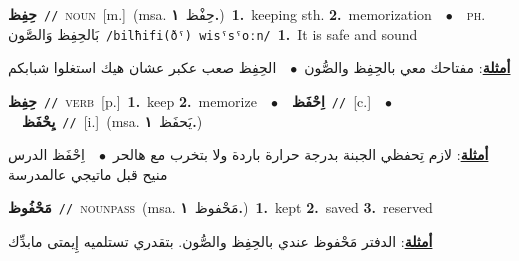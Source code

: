 \documentclass[10pt,a4paper,twoside]{article} %
\begin{document}
\begin{multicols}{2}
{\setlength\topsep{0pt}\textbf{\foreignlanguage{arabic}{حِفِظ}}\ {\color{gray}\texttt{//}\color{black}}\ \textsc{noun}\ [m.]\ \color{gray}(msa. \foreignlanguage{arabic}{حِفْظ}~\foreignlanguage{arabic}{\textbf{١.}})\color{black}\ \textbf{1.}~keeping sth.  \textbf{2.}~memorization\ \ $\bullet$\ \ \textsc{ph.} \color{gray} \foreignlanguage{arabic}{بَالحِفِظ وَالصَّون}\color{black}\ {\color{gray}\texttt{/{\sffamily bilħifi(ðˤ) wisˤsˤoːn}/}\color{black}}\ \textbf{1.}~It is safe and sound\  \begin{flushright}\color{gray}\foreignlanguage{arabic}{\textbf{\underline{\foreignlanguage{arabic}{أمثلة}}}: مفتاحك معي بالحِفِظ والصُّون\ $\bullet$\ \  الحِفِظ صعب عكبر عشان هيك استغلوا شبابكم}\end{flushright}\color{black}} \vspace{2mm}

{\setlength\topsep{0pt}\textbf{\foreignlanguage{arabic}{حِفِظ}}\ {\color{gray}\texttt{//}\color{black}}\ \textsc{verb}\ [p.]\ \textbf{1.}~keep  \textbf{2.}~memorize\ \ $\bullet$\ \ \setlength\topsep{0pt}\textbf{\foreignlanguage{arabic}{اِحْفَظ}}\ {\color{gray}\texttt{//}\color{black}}\ [c.]\ \ $\bullet$\ \ \setlength\topsep{0pt}\textbf{\foreignlanguage{arabic}{يِحْفَظ}}\ {\color{gray}\texttt{//}\color{black}}\ [i.]\ \color{gray}(msa. \foreignlanguage{arabic}{يَحفَظ}~\foreignlanguage{arabic}{\textbf{١.}})\color{black}\  \begin{flushright}\color{gray}\foreignlanguage{arabic}{\textbf{\underline{\foreignlanguage{arabic}{أمثلة}}}: لازم تِحفظي الجبنة بدرجة حرارة باردة ولا بتخرب مع هالحر\ $\bullet$\ \  اِحْفَظ الدرس منيح قبل ماتيجي عالمدرسة}\end{flushright}\color{black}} \vspace{2mm}

{\setlength\topsep{0pt}\textbf{\foreignlanguage{arabic}{مَحْفُوظ}}\ {\color{gray}\texttt{//}\color{black}}\ \textsc{noun\textunderscore pass}\ \color{gray}(msa. \foreignlanguage{arabic}{مَحْفوظ}~\foreignlanguage{arabic}{\textbf{١.}})\color{black}\ \textbf{1.}~kept  \textbf{2.}~saved  \textbf{3.}~reserved\  \begin{flushright}\color{gray}\foreignlanguage{arabic}{\textbf{\underline{\foreignlanguage{arabic}{أمثلة}}}: الدفتر مَحْفوظ عندي بالحِفِظ والصُّون. بتقدري تستلميه إِيمتى مابدِّك}\end{flushright}\color{black}} \vspace{2mm}


\end{multicols}
\end{document}

